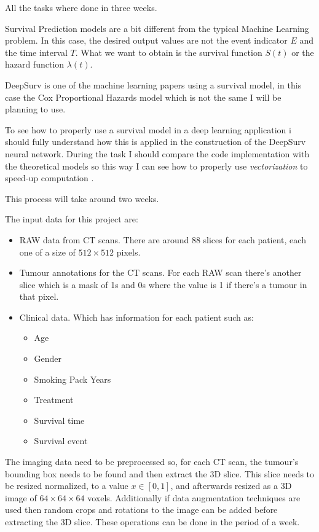 All the tasks where done in three weeks.


Survival Prediction models are a bit different from the typical Machine Learning problem. 
In this case, the desired output values are not the event indicator \( E \) and the time
interval \( T \). What we want to obtain is the survival function \( S(t) \) or the 
hazard function \( \lambda(t) \).

DeepSurv is one of the machine learning papers using a survival model, in this case the
Cox Proportional Hazards model which is not the same I will be planning to use.

To see how to properly use a survival model in a deep learning application i should fully 
understand how this is applied in the construction of the DeepSurv neural network. During 
the task I should compare the code implementation with the theoretical models so this way
I can see how to properly use \emph{vectorization} to speed-up computation
\cites{medical:cox}{medical:deep-surv}.

This process will take around two weeks.


The input data for this project are:
\begin{itemize}
  \item RAW data from CT scans. There are around 88 slices for each patient, each one of 
  a size of \( 512 \times 512 \) pixels.
  \item Tumour annotations for the CT scans. For each RAW scan there's another slice which
  is a mask of 1s and 0s where the value is 1 if there's a tumour in that pixel.
  \item Clinical data. Which has information for each patient such as:
  \begin{itemize}
    \item Age
    \item Gender
    \item Smoking Pack Years
    \item Treatment
    \item Survival time
    \item Survival event
  \end{itemize}
\end{itemize}

The imaging data need to be preprocessed so, for each CT scan, the tumour's bounding
box needs to be found and then extract the 3D slice. This slice needs to be resized 
normalized, to a value \( x \in [0, 1] \), and afterwards resized as a 3D image of 
\( 64 \times 64 \times 64 \) voxels. Additionally if data augmentation techniques are 
used then random crops and rotations to the image can be added before extracting the
3D slice. These operations can be done in the period of a week.

